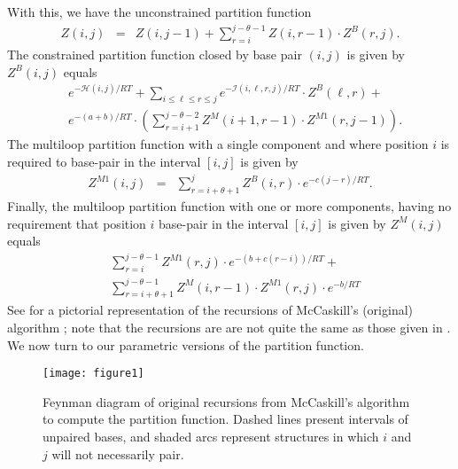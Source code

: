 With this, we have the unconstrained partition function
\begin{eqnarray}
Z(i,j) &= &Z(i,j-1) + \sum_{r=i}^{j-\theta-1} Z(i,r-1) \cdot Z^B(r,j).
\end{eqnarray}
The constrained partition function closed by base pair $(i,j)$ is
given by
$Z^B(i,j)$ equals
\begin{eqnarray}
&e^{-\mathcal{H}(i,j)/RT} +
\displaystyle\sum_{i \leq \ell \leq r \leq j}
e^{-\mathcal{I}(i,\ell,r,j)/RT}\cdot Z^B(\ell,r) +\\
& e^{-(a+b)/RT} \cdot \left( \sum_{r=i+1}^{j-\theta-2} Z^M(i+1,r-1)
\cdot Z^{M1}(r,j-1) \right). \nonumber
\end{eqnarray}
The multiloop partition function with a single component and where
position $i$ is required to base-pair in the interval $[i,j]$ is given
by
\begin{eqnarray}
Z^{M1}(i,j) &= &
\displaystyle\sum_{r=i+\theta+1}^j Z^B(i,r) \cdot
e^{-c(j-r)/RT} .
\end{eqnarray}
Finally, the multiloop partition function with one or more components,
having no requirement that position $i$ base-pair in the interval $[i,j]$
is given by $Z^{M}(i,j)$ equals
\begin{eqnarray}
&
\displaystyle\sum_{r=i}^{j-\theta-1}  Z^{M1}(r,j) \cdot
e^{-(b+c(r-i))/RT}  + \\
&\displaystyle\sum_{r=i+\theta+1}^{j-\theta-1}  Z^{M}(i,r-1) \cdot
Z^{M1}(r,j) \cdot e^{-b/RT}  \nonumber
\end{eqnarray}
See  for a pictorial representation
of the recursions of McCaskill's (original) algorithm \citep{mcCaskill};
note that the recursions are are not quite the same
as those given in \citep{hofacker:FastFolding}.
We now turn to our parametric versions of the partition function.

\begin{figure}[htp]
\centerline{\texttt{[image: figure1]}}
\caption{Feynman diagram of original recursions from McCaskill's
algorithm \citep{mcCaskill} to compute the partition function.
Dashed lines present intervals of unpaired bases, and shaded
arcs represent structures in which $i$ and $j$ will not necessarily pair.
}
\label{fig:feynmanDiagram}
\end{figure}


